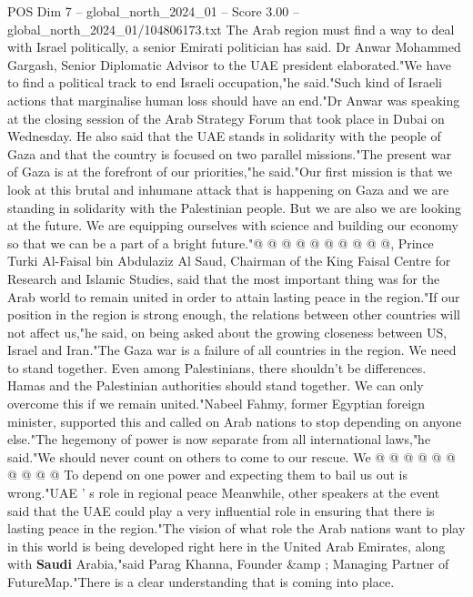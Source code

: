 \begin{textsample}{POS Dim 7 – global\_north\_2024\_01 – Score 3.00 – global\_north\_2024\_01/104806173.txt}  \label{ex:f7_pos_240}
The Arab region must find a way to deal with Israel politically, a senior Emirati politician has said.
Dr Anwar Mohammed Gargash, Senior Diplomatic Advisor to the UAE president elaborated."We have to find a political track to end Israeli occupation,"he said."Such kind of Israeli actions that marginalise human loss should have an end."Dr Anwar was speaking at the closing session of the Arab Strategy Forum that took place in Dubai on Wednesday.
He also said that the UAE stands in solidarity with the people of Gaza and that the country is focused on two parallel missions."The present war of Gaza is at the forefront of our priorities,"he said."Our first mission is that we look at this brutal and inhumane attack that is happening on Gaza and we are standing in solidarity with the Palestinian people.
But we are also we are looking at the future.
We are equipping ourselves with science and building our economy so that we can be a part of a bright future."@ @ @ @ @ @ @ @ @ @, Prince Turki Al-Faisal bin Abdulaziz Al Saud, Chairman of the King Faisal Centre for Research and Islamic Studies, said that the most important thing was for the Arab world to remain united in order to attain lasting peace in the region."If our position in the region is strong enough, the relations between other countries will not affect us,"he said, on being asked about the growing closeness between US, Israel and Iran."The Gaza war is a failure of all countries in the region.
We need to stand together.
Even among Palestinians, there shouldn't be differences.
Hamas and the Palestinian authorities should stand together.
We can only overcome this if we remain united."Nabeel Fahmy, former Egyptian foreign minister, supported this and called on Arab nations to stop depending on anyone else."The hegemony of power is now separate from all international laws,"he said."We should never count on others to come to our rescue.
We @ @ @ @ @ @ @ @ @ @ To depend on one power and expecting them to bail us out is wrong."UAE ' s role in regional peace Meanwhile, other speakers at the event said that the UAE could play a very influential role in ensuring that there is lasting peace in the region."The vision of what role the Arab nations want to play in this world is being developed right here in the United Arab Emirates, along with \textbf{Saudi} Arabia,"said Parag Khanna, Founder \&amp ; Managing Partner of FutureMap."There is a clear understanding that is coming into place.

\end{textsample}
